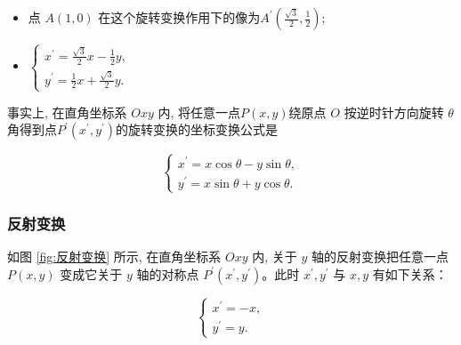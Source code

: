 \begin{solution}
\begin{itemize}
    \item 点 $A(1,0)$ 在这个旋转变换作用下的像为$A^{\prime}\left(\frac{\sqrt{3}}{2}, \frac{1}{2}\right)$;
    \item $\left\{\begin{array}{l}x^{\prime}=\frac{\sqrt{3}}{2} x-\frac{1}{2} y, \\ y^{\prime}=\frac{1}{2} x+\frac{\sqrt{3}}{2} y .\end{array}\right.$
\end{itemize}
\end{solution}

\vspace{0.5cm}

事实上, 在直角坐标系 $O x y$ 内, 将任意一点$P(x, y)$绕原点 $O$ 按逆时针方向旋转 $\theta$ 角得到点$P^{\prime}(x^{\prime}, y^{\prime})$的旋转变换的坐标变换公式是

\begin{equation}
\left\{\begin{array}{l}
x^{\prime}=x \cos \theta-y \sin \theta, \\
y^{\prime}=x \sin \theta+y \cos \theta .
\end{array}\right.\label{eq:旋转变换的坐标变换公式}
\end{equation}

\subsubsection{反射变换}
\label{subsubsec:反射变换}

如图 \ref{fig:反射变换} 所示, 在直角坐标系 $O x y$ 内, 关于 $y$ 轴的反射变换把任意一点 $P(x, y)$ 变成它关于 $y$ 轴的对称点 $P^{\prime}\left(x^{\prime}, y^{\prime}\right)$。此时 $x^{\prime}, y^{\prime}$ 与 $x, y$ 有如下关系：

\begin{equation}
\left\{\begin{array}{l}
x^{\prime}=-x, \\
y^{\prime}=y .
\end{array}\right.
\label{eq:反射变换的表达式}
\end{equation}

